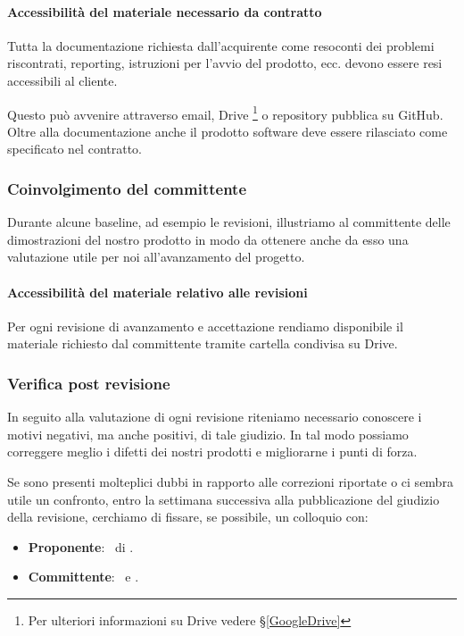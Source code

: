 		\paragraph{Accessibilità del materiale necessario da contratto} \label{AccessibilitaMateriale}
		Tutta la documentazione richiesta dall'acquirente come resoconti dei problemi riscontrati,  reporting, istruzioni per l'avvio del prodotto, ecc. devono essere resi accessibili al cliente. \par
		Questo può avvenire attraverso email, Drive \footnote{Per ulteriori informazioni su Drive vedere \S\ref{GoogleDrive}} o repository pubblica su GitHub.
		Oltre alla documentazione anche il prodotto software deve essere rilasciato come specificato nel contratto.

		\subsubsection{Coinvolgimento del committente} \label{CoinvolgimentoCommittente}
		Durante alcune baseline, ad esempio le revisioni,
		illustriamo al committente delle dimostrazioni del nostro prodotto in modo da ottenere anche da esso una valutazione utile per noi all'avanzamento del progetto.

		\paragraph{Accessibilità del materiale relativo alle revisioni} \label{AccessibilitaMaterialeRevisioni}
		Per ogni revisione di avanzamento e accettazione rendiamo disponibile il materiale richiesto dal committente tramite cartella condivisa su Drive.

		\subsubsection{Verifica post revisione} \label{verificapostrevisione}
        In seguito alla valutazione di ogni revisione riteniamo necessario conoscere i motivi negativi, ma anche positivi, di tale giudizio. In tal modo possiamo correggere meglio i difetti dei nostri prodotti e migliorarne i punti di forza. \par
        Se sono presenti molteplici dubbi in rapporto alle correzioni riportate o ci sembra utile un confronto, entro la settimana successiva alla pubblicazione del giudizio della revisione, cerchiamo di fissare, se possibile, un colloquio con:
        \begin{itemize}
            \item \textbf{Proponente}: \DZ\ di \II.
            \item \textbf{Committente}: \TV\ e \RC.
		\end{itemize}


